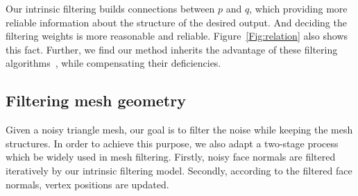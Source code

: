 Our intrinsic filtering builds connections between $p$ and $q$, which providing more reliable information about the structure of the desired output.
And deciding the filtering weights is more reasonable and reliable.
Figure~\ref{Fig:relation} also shows this fact.
Further, we find our method inherits the advantage of these filtering algorithms~\cite{tomasi1998bilateral, grazzini2009edge, Chang2015propagated}, while compensating their deficiencies.


\subsection{Filtering mesh geometry}

Given a noisy triangle mesh, our goal is to filter the noise while keeping the mesh structures.
In order to achieve this purpose, we also adapt a two-stage process which be widely used in mesh filtering.
Firstly, noisy face normals are filtered iteratively by our intrinsic filtering model. %
Secondly, according to the filtered face normals, vertex positions are updated.%

